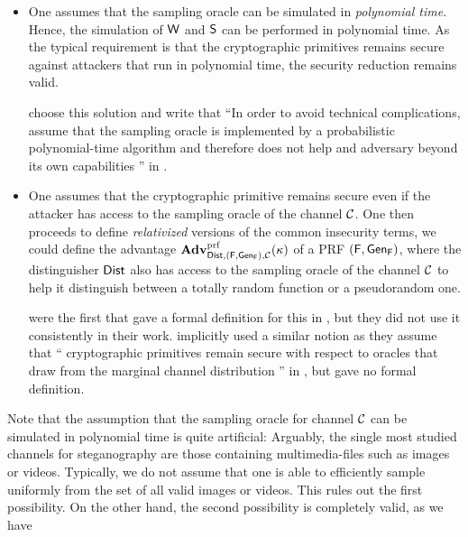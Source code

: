 \begin{itemize}
\item One assumes that the sampling oracle can be simulated in
  \emph{polynomial time}. Hence, the simulation of $\operatorname{\mathsf{W}}$ and $\operatorname{\mathsf{S}}$
  can be performed in polynomial time. As the typical requirement is
  that the cryptographic primitives remains secure against attackers
  that run in polynomial time, the security reduction remains valid.

  \citeauthor{backes2005active} choose this solution and write that
  \enquote{In order to avoid technical complications, assume \wlogeneral
    that the sampling oracle is implemented by a probabilistic
    polynomial-time algorithm and therefore does not help and adversary
    beyond its own capabilities \textelp{}} in \cite[page
  213]{backes2005active}. 

\item One assumes that the cryptographic primitive remains secure even
  if the attacker has access to the sampling oracle of the channel
  $\mathcal{C}$. One then proceeds to define \emph{relativized} versions of
  the common insecurity terms, \eg we could define the advantage
  $\operatorname{\mathbf{Adv}}_{\operatorname{\mathsf{Dist}},(\operatorname{\mathsf{F}},\operatorname{\mathsf{Gen}}_{\operatorname{\mathsf{F}}}),\mathcal{C}}^{\operatorname{prf}}(\kappa)$ of a
  \acl{PRF} $(\operatorname{\mathsf{F}},\operatorname{\mathsf{Gen}}_{\operatorname{\mathsf{F}}})$, where the distinguisher $\operatorname{\mathsf{Dist}}$ also
  has access to the sampling oracle of the channel $\mathcal{C}$ to help it
  distinguish between a totally random function or a pseudorandom one.

  \citeauthor{dedic2009lower} were the first that gave a formal
  definition for this in \cite{dedic2009lower}, but they did not use it
  consistently in their work.  \citeauthor{hopper2009provably}
  implicitly used a similar notion as they assume that
  \enquote{\textelp{} cryptographic primitives remain secure with
    respect to oracles that draw from the marginal channel distribution
    \textelp{}} in \cite[page 665]{hopper2009provably}, but gave no
  formal definition. 


\end{itemize}
%
Note that the assumption that the sampling oracle for channel $\mathcal{C}$
can be simulated in polynomial time is quite artificial: Arguably, the
single most studied channels for steganography are those containing
multimedia-files such as images or videos. Typically, we do not assume
that one is able to efficiently sample uniformly from the set of all
valid images or videos. This rules out the first possibility. On the
other hand, the second possibility is completely valid, as we have
